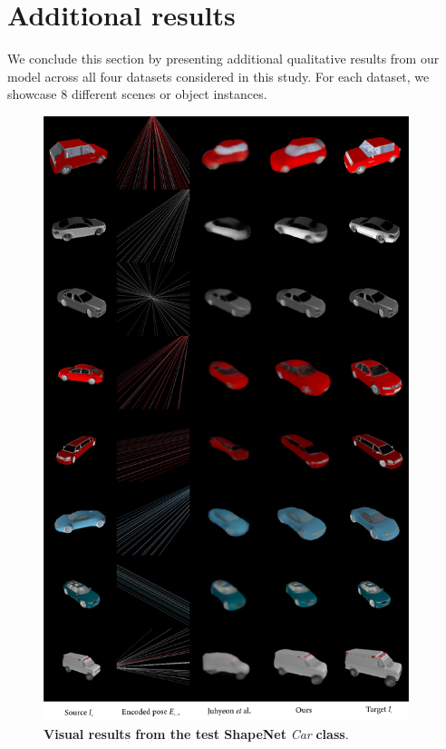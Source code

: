 \section{Additional results}

We conclude this section by presenting additional qualitative results from our model across all four datasets considered in this study. For each dataset, we showcase 8 different scenes or object instances.

\begin{figure}[htp!]
    \begin{center}
    \includegraphics[width=0.95\textwidth]{images/epipolarnvs/SuppMat_Car_New.png}
    \end{center}
     \caption{\textbf{Visual results from the test ShapeNet} \citep{xu2019disn} \textit{Car} \textbf{class}.}     
     \label{fig:add_visCar}
\end{figure}

